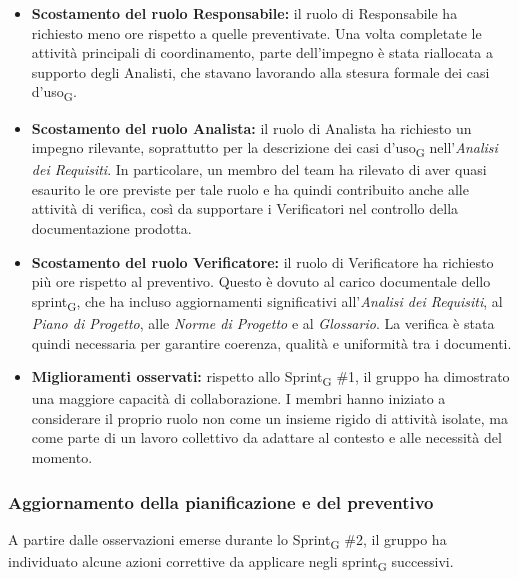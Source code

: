 \documentclass[a4paper, 10pt, colorlinks=true, linkcolor=black, urlcolor=blue, citecolor=blue, hidelinks]{article}
\begin{document}
\begin{itemize}
    \item \textbf{Scostamento del ruolo Responsabile:}
    il ruolo di Responsabile ha richiesto meno ore rispetto a quelle preventivate. Una volta completate le attività principali di coordinamento, parte dell'impegno è stata riallocata a supporto degli Analisti, che stavano lavorando alla stesura formale dei casi d'uso\textsubscript{G}.

    \item \textbf{Scostamento del ruolo Analista:}
    il ruolo di Analista ha richiesto un impegno rilevante, soprattutto per la descrizione dei casi d'uso\textsubscript{G} nell'\textit{Analisi dei Requisiti}. In particolare, un membro del team ha rilevato di aver quasi esaurito le ore previste per tale ruolo e ha quindi contribuito anche alle attività di verifica, così da supportare i Verificatori nel controllo della documentazione prodotta.

    \item \textbf{Scostamento del ruolo Verificatore:}
    il ruolo di Verificatore ha richiesto più ore rispetto al preventivo. Questo è dovuto al carico documentale dello sprint\textsubscript{G}, che ha incluso aggiornamenti significativi all'\textit{Analisi dei Requisiti}, al \textit{Piano di Progetto}, alle \textit{Norme di Progetto} e al \textit{Glossario}. La verifica è stata quindi necessaria per garantire coerenza, qualità e uniformità tra i documenti.

    \item \textbf{Miglioramenti osservati:}
    rispetto allo Sprint\textsubscript{G} \#1, il gruppo ha dimostrato una maggiore capacità di collaborazione. I membri hanno iniziato a considerare il proprio ruolo non come un insieme rigido di attività isolate, ma come parte di un lavoro collettivo da adattare al contesto e alle necessità del momento.
\end{itemize}

\subsubsection{Aggiornamento della pianificazione e del preventivo}
A partire dalle osservazioni emerse durante lo Sprint\textsubscript{G} \#2, il gruppo ha individuato alcune azioni correttive da applicare negli sprint\textsubscript{G} successivi.
\end{document}
